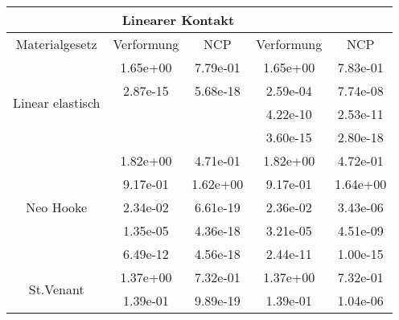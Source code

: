 \begin{table} 
\centering 
\begin{tabular}{c|cc|cc|} 
\cline{2-5} 
 & \multicolumn{2}{|c|}{Linearer Kontakt} &  \\ 
\hline 
\multicolumn{1}{|c|}{Materialgesetz} & \multicolumn{1}{c|}{Verformung} & \multicolumn{1}{c|}{NCP} & \multicolumn{1}{c|}{Verformung} & \multicolumn{1}{c|}{NCP} \\ 
\hline 
\multicolumn{1}{|c|}{\multirow{4}{*}{Linear elastisch}} &\multicolumn{1}{|c|}{  1.65e+00} & \multicolumn{1}{|c|}{  7.79e-01} & \multicolumn{1}{|c|}{  1.65e+00} & \multicolumn{1}{|c|}{  7.83e-01} \\ 
\multicolumn{1}{|c|}{} & \multicolumn{1}{|c|}{  2.87e-15} & \multicolumn{1}{|c|}{  5.68e-18} & \multicolumn{1}{|c|}{  2.59e-04} & \multicolumn{1}{|c|}{  7.74e-08} \\ 
\multicolumn{1}{|c|}{} & \multicolumn{1}{|c|}{} & \multicolumn{1}{|c|}{} & \multicolumn{1}{|c|}{  4.22e-10} & \multicolumn{1}{|c|}{  2.53e-11} \\ 
\multicolumn{1}{|c|}{} & \multicolumn{1}{|c|}{} & \multicolumn{1}{|c|}{} & \multicolumn{1}{|c|}{  3.60e-15} & \multicolumn{1}{|c|}{  2.80e-18} \\ 
\hline 
\multicolumn{1}{|c|}{\multirow{5}{*}{Neo Hooke}} &\multicolumn{1}{|c|}{  1.82e+00} & \multicolumn{1}{|c|}{  4.71e-01} & \multicolumn{1}{|c|}{  1.82e+00} & \multicolumn{1}{|c|}{  4.72e-01} \\ 
\multicolumn{1}{|c|}{} & \multicolumn{1}{|c|}{  9.17e-01} & \multicolumn{1}{|c|}{  1.62e+00} & \multicolumn{1}{|c|}{  9.17e-01} & \multicolumn{1}{|c|}{  1.64e+00} \\ 
\multicolumn{1}{|c|}{} & \multicolumn{1}{|c|}{  2.34e-02} & \multicolumn{1}{|c|}{  6.61e-19} & \multicolumn{1}{|c|}{  2.36e-02} & \multicolumn{1}{|c|}{  3.43e-06} \\ 
\multicolumn{1}{|c|}{} & \multicolumn{1}{|c|}{  1.35e-05} & \multicolumn{1}{|c|}{  4.36e-18} & \multicolumn{1}{|c|}{  3.21e-05} & \multicolumn{1}{|c|}{  4.51e-09} \\ 
\multicolumn{1}{|c|}{} & \multicolumn{1}{|c|}{  6.49e-12} & \multicolumn{1}{|c|}{  4.56e-18} & \multicolumn{1}{|c|}{  2.44e-11} & \multicolumn{1}{|c|}{  1.00e-15} \\ 
\hline 
\multicolumn{1}{|c|}{\multirow{5}{*}{St.Venant}} &\multicolumn{1}{|c|}{  1.37e+00} & \multicolumn{1}{|c|}{  7.32e-01} & \multicolumn{1}{|c|}{  1.37e+00} & \multicolumn{1}{|c|}{  7.32e-01} \\ 
\multicolumn{1}{|c|}{} & \multicolumn{1}{|c|}{  1.39e-01} & \multicolumn{1}{|c|}{  9.89e-19} & \multicolumn{1}{|c|}{  1.39e-01} & \multicolumn{1}{|c|}{  1.04e-06} \\ 

\end{tabular}
\end{table}
